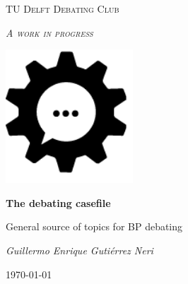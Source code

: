 
\begin{titlepage}
	\centering

	{\scshape\huge TU Delft Debating Club \par}
    {\scshape\Large \emph{A work in progress} \par}
    
    \vspace{1.5cm}
    \includegraphics[height=5cm]{img/debate.png}
	
    \par\vspace{1cm}
	{\huge\bfseries The debating casefile \par}
    {\large General source of topics for BP debating  \par}
	
    \vspace{2cm}
	{\Large\itshape Guillermo Enrique Gutiérrez Neri  \par}
	
    \vfill
	{\large\today\par}
\end{titlepage}
